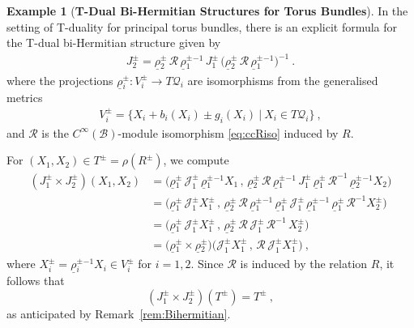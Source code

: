 \documentclass[a4paper, reqno, 11pt]{amsart}
\numberwithin{equation}{section}
\theoremstyle{definition}
\newtheorem{example}[equation]{Example}
\newcommand{\red}[1]{\underline{#1}}
\newcommand{\cB}{{\mathcal B}}
\newcommand{\cQ}{{\mathcal Q}}
\newcommand{\cJ}{{\mathcal J}}
\newcommand{\ccR}{{\mathscr R}}
\theoremstyle{remark}
\begin{document}
\begin{example}[\textbf{T-Dual Bi-Hermitian Structures for Torus Bundles}]
    In the setting of T-duality for principal torus bundles, there is an explicit formula for the T-dual bi-Hermitian structure given by \cite[Example 4.7]{cavalcanti2011generalized}
    \begin{align}
        J_2^\pm = \red\rho{}_2^\pm \, \mathscr{R} \, \red\rho{}_1^\pm{}^{-1} \, J_1^\pm \, \big(\red\rho{}_2^\pm \, \mathscr{R} \, \red\rho{}_1^\pm{}^{-1}\big)^{-1} \ .
    \end{align}
    where the projections $\red\rho{}^\pm_i:V_i^\pm\to T\cQ_i$ are isomorphisms from the generalised metrics
    \begin{align}
        V_i^\pm = \{X_i + b_i(X_i)\pm g_i(X_i) \ \vert \ X_i\in T\cQ_i\} \ ,
    \end{align}
    and $\ccR$ is the $C^\infty(\cB)$-module isomorphism \eqref{eq:ccRiso} induced by $R$. 
    
    For $(X_1, X_2) \in T^\pm=\rho(R^\pm)$, we compute
    \begin{equation}
    \begin{aligned}
        (J_1^\pm \times J_2^\pm)(X_1,X_2) &= 
        \big(\red\rho{}_1^\pm\, \cJ_1^\pm \, \red\rho{}_1^\pm{}^{-1} X_1 \, , \, \red\rho{}_2^\pm\, \mathscr{R} \, \red\rho{}_1^\pm{}^{-1}\, J_1^\pm\, \red\rho{}_1^\pm \, \mathscr{R}^{-1} \, \red\rho{}_2^\pm{}^{-1} X_2\big)\\[4pt]
        &=\big(\red\rho{}_1^\pm\, \cJ_1^\pm X_1^\pm \, , \, \red\rho{}_2^\pm \, \mathscr{R} \, \red\rho{}_1^\pm{}^{-1}\, \red\rho{}_1^\pm\, \cJ_1^\pm \, \red\rho{}_1^\pm{}^{-1}\, \red\rho{}_1^\pm\, \mathscr{R}^{-1} X_2^\pm\big)\\[4pt]
        &=\big(\red\rho{}_1^\pm\, \cJ_1^\pm X_1^\pm\, , \,  \red\rho{}_2^\pm\, \mathscr{R}\, \cJ_1^\pm\, \mathscr{R}^{-1} \, X_2^\pm\big)\\[4pt]
        &=\big(\red\rho{}_1^\pm \times \red\rho{}_2^\pm\big)\big(\cJ_1^\pm X^\pm_1 \, , \, \mathscr{R}\, \cJ_1^\pm X_1^\pm\big) \ ,
    \end{aligned}
    \end{equation}
    where $X_i^\pm = \red\rho{}_i^\pm{}^{-1}X_i\in V_i^\pm$ for $i=1,2$.
    Since $\mathscr{R}$ is induced by the relation $R$, it follows that $$(J_1^\pm \times J_2^\pm)(T^\pm) = T^\pm \ , $$ as anticipated by Remark~\ref{rem:Bihermitian}.
\end{example}
\end{document}
